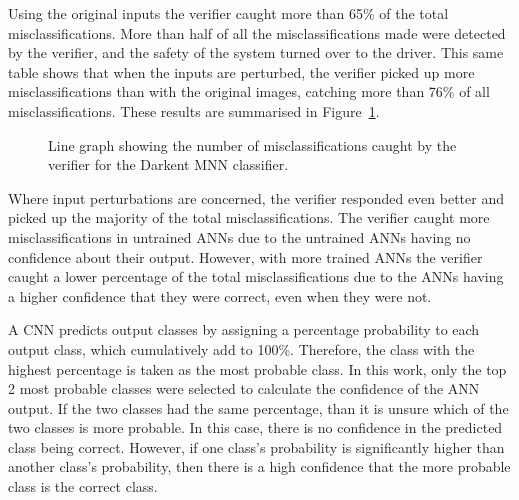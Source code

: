 Using the original inputs the verifier caught more than 65\% of the total misclassifications.
More than half of all the misclassifications made were detected by the verifier, and the safety of the system turned over to the driver.
This same table shows that when the inputs are perturbed, the verifier picked up more misclassifications than with the original images, catching more than 76\% of all misclassifications.
These results are summarised in Figure~\ref{fig:sign-graphboth}.

\begin{figure}[H]
	\centering
	\scalebox{0.9}{}
	\caption{Line graph showing the number of misclassifications caught by the verifier for the Darkent \ac{MNN} classifier. \label{fig:sign-graphboth}}
\end{figure}

Where input perturbations are concerned, the verifier responded even better and picked up the majority of the total misclassifications.
The verifier caught more misclassifications in untrained \acp{ANN} due to the untrained \acp{ANN} having no confidence about their output.
However, with more trained \acp{ANN} the verifier caught a lower percentage of the total misclassifications due to the \acp{ANN} having a higher confidence that they were correct, even when they were not.

A \ac{CNN} predicts output classes by assigning a percentage probability to each output class, which cumulatively add to 100\%.
Therefore, the class with the highest percentage is taken as the most probable class.
In this work, only the top 2 most probable classes were selected to calculate the confidence of the \ac{ANN} output.
If the two classes had the same percentage, than it is unsure which of the two classes is more probable.
In this case, there is no confidence in the predicted class being correct.
However, if one class's probability is significantly higher than another class's probability, then there is a high confidence that the more probable class is the correct class.

